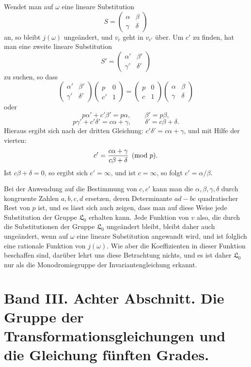 \documentclass[11pt]{article}
\begin{document}
Wendet man auf $\omega$ eine lineare Substitution
\[
 S=\begin{pmatrix}\alpha&\beta\\ \gamma&\delta\end{pmatrix}
\]
an, so bleibt $j(\omega)$ ungeändert, und $v_c$ geht in $v_{c'}$ über. Um $c'$ zu finden, hat man eine zweite lineare Substitution
\[
 S'=\begin{pmatrix}\alpha'&\beta'\\ \gamma'&\delta'\end{pmatrix}
\]
zu suchen, so dass
\[
\begin{pmatrix}\alpha'&\beta'\\ \gamma'&\delta'\end{pmatrix}
\begin{pmatrix}p&0\\ c'&1\end{pmatrix}
=
\begin{pmatrix}p&0\\ c&1\end{pmatrix}
\begin{pmatrix}\alpha&\beta\\ \gamma&\delta\end{pmatrix}
\]
oder
\[
 p\alpha'+c'\beta'=p\alpha,
 \qquad
 \beta'=p\beta,
\]
\[
 p\gamma'+c'\delta'=c\alpha+\gamma,
 \qquad
 \delta'=c\beta+\delta.
\]
Hieraus ergibt sich nach der dritten Gleichung: $c'\delta'=c\alpha+\gamma$, und mit Hilfe der vierten:
\[
 c'={c\alpha+\gamma\over c\beta+\delta}\pmod p.
\]
Ist $c\beta+\delta=0$, so ergibt sich $c'=\infty$, und ist $c=\infty$, so folgt $c'=\alpha/\beta$.

Bei der Anwendung auf die Bestimmung von $c,c'$ kann man die $\alpha,\beta,\gamma,\delta$ durch kongruente Zahlen $a,b,c,d$ ersetzen, deren Determinante $ad-bc$ quadratischer Rest von $p$ ist, und es lässt sich auch zeigen, dass man auf diese Weise jede Substitution der Gruppe $\mathfrak L_0$ erhalten kann. Jede Funktion von $v$ also, die durch die Substitutionen der Gruppe $\mathfrak L_0$ ungeändert bleibt, bleibt daher auch ungeändert, wenn auf $\omega$ eine lineare Substitution angewandt wird, und ist folglich eine rationale Funktion von $j(\omega)$. Wie aber die Koeffizienten in dieser Funktion beschaffen sind, darüber lehrt uns diese Betrachtung nichts, und es ist daher $\mathfrak L_0$ nur als die Monodromiegruppe der Invariantengleichung erkannt.

\clearpage
\section*{Band III. Achter Abschnitt. Die Gruppe der Transformationsgleichungen und die Gleichung fünften Grades.}
\end{document}
